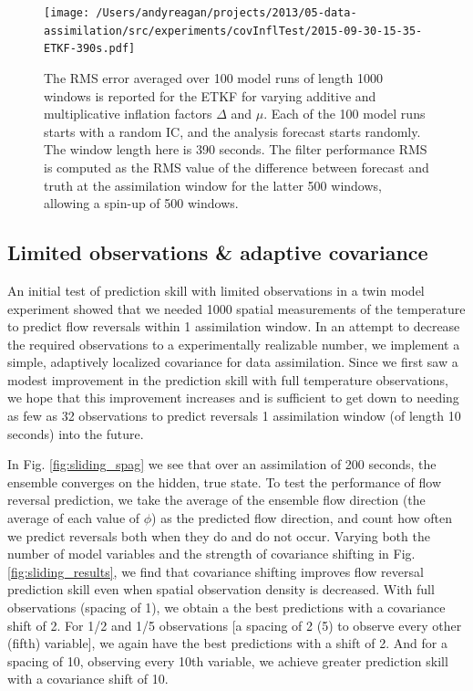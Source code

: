 \begin{figure}[h]
  \centering
  \texttt{[image: /Users/andyreagan/projects/2013/05-data-assimilation/src/experiments/covInflTest/2015-09-30-15-35-ETKF-390s.pdf]}
  \caption[The RMS error averaged over 100 model runs of length 1000 windows is reported for the ETKF for varying additive and multiplicative inflation factors]{
    The RMS error averaged over 100 model runs of length 1000 windows is reported for the ETKF for varying additive and multiplicative inflation factors $\Delta$ and $\mu$.
    Each of the 100 model runs starts with a random IC, and the analysis forecast starts randomly.
    The window length here is 390 seconds.
    The filter performance RMS is computed as the RMS value of the difference between forecast and truth at the assimilation window for the latter 500 windows, allowing a spin-up of 500 windows.
  }
  \label{fig:ETKF_cov_tuning_390s}
\end{figure}

\subsection*{Limited observations \& adaptive covariance}

An initial test of prediction skill with limited observations in a twin model experiment showed that we needed 1000 spatial measurements of the temperature to predict flow reversals within 1 assimilation window.
In an attempt to decrease the required observations to a experimentally realizable number, we implement a simple, adaptively localized covariance for data assimilation.
Since we first saw a modest improvement in the prediction skill with full temperature observations, we hope that this improvement increases and is sufficient to get down to needing as few as 32 observations to predict reversals 1 assimilation window (of length 10 seconds) into the future.

In Fig. \ref{fig:sliding_spag} we see that over an assimilation of 200 seconds, the ensemble converges on the hidden, true state.
To test the performance of flow reversal prediction, we take the average of the ensemble flow direction (the average of each value of $\phi$) as the predicted flow direction, and count how often we predict reversals both when they do and do not occur.
Varying both the number of model variables and the strength of covariance shifting in Fig. \ref{fig:sliding_results}, we find that covariance shifting improves flow reversal prediction skill even when spatial observation density is decreased.
With full observations (spacing of 1), we obtain a the best predictions with a covariance shift of 2.
For 1/2 and 1/5 observations [a spacing of 2 (5) to observe every other (fifth) variable], we again have the best predictions with a shift of 2.
And for a spacing of 10, observing every 10th variable, we achieve greater prediction skill with a covariance shift of 10.

